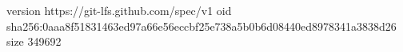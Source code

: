 version https://git-lfs.github.com/spec/v1
oid sha256:0aaa8f51831463ed97a66e56eccbf25e738a5b0b6d08440ed8978341a3838d26
size 349692
